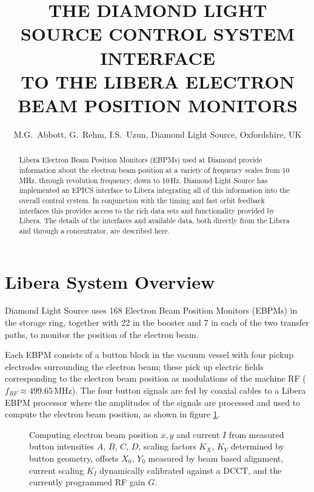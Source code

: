 \documentclass{JAC2003}
\begin{document}
\title{%
    THE DIAMOND LIGHT SOURCE CONTROL SYSTEM INTERFACE \\
    TO THE LIBERA ELECTRON BEAM POSITION MONITORS}

\author{%
    M.G.~Abbott, G.~Rehm, I.S.~Uzun,
    Diamond Light Source, Oxfordshire, UK}

\maketitle

\begin{abstract}
    Libera Electron Beam Position Monitors (EBPMs) used at Diamond provide
    information about the electron beam position at a variety of frequency
    scales from 10\,MHz, through revolution frequency, down to 10\,Hz.
    Diamond Light Source has implemented an EPICS interface to Libera
    integrating all of this information into the overall control system. In
    conjunction with the timing and fast orbit feedback interfaces this
    provides access to the rich data sets and functionality provided by
    Libera. The details of the interfaces and available data, both directly
    from the Libera and through a concentrator, are described here.
\end{abstract}




\section{Libera System Overview}

Diamond Light Source uses 168 Electron Beam Position Monitors (EBPMs) in the
storage ring, together with 22 in the booster and 7 in each of the two transfer
paths, to monitor the position of the electron beam.  

Each EBPM consists of a button block in the vacuum vessel with four pickup
electrodes surrounding the electron beam; these pick up electric fields
corresponding to the electron beam position as modulations of the machine RF
($f_{RF} \approx 499.65\,$MHz).  The four button signals are fed by coaxial
cables to a Libera\cite{i-tech} EBPM processor where the amplitudes of the
signals are processed and used to compute the electron beam position, as shown
in figure \ref{buttons}.

\begin{figure}[h]
\centering

\caption{%
    Computing electron beam position $x,y$ and current $I$ from measured
    button intensities $A$, $B$, $C$, $D$, scaling factors $K_X$, $K_Y$
    determined by button geometry, offsets $X_0$, $Y_0$ measured by beam
    based alignment, current scaling $K_I$ dynamically calibrated against
    a DCCT, and the currently programmed RF gain $G$.
}
\label{buttons}
\end{figure}
\end{document}
